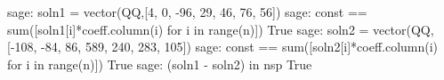 %
\begin{sageexample}
sage: soln1 = vector(QQ,[4, 0, -96, 29, 46, 76, 56])
sage: const == sum([soln1[i]*coeff.column(i) for i in range(n)])
True
sage: soln2 = vector(QQ,[-108, -84, 86, 589, 240, 283, 105])
sage: const == sum([soln2[i]*coeff.column(i) for i in range(n)])
True
sage: (soln1 - soln2) in nsp
True
\end{sageexample}
%
\begin{sageverbatim}
\end{sageverbatim}
%

